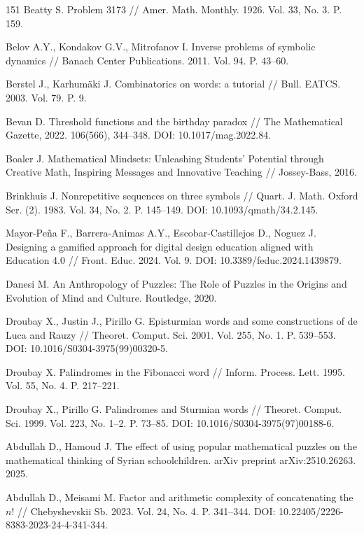 \documentclass[a4paper,14pt]{extreport}
\theoremstyle{plain}
\theoremstyle{definition}
\theoremstyle{remark}
\begin{document}
\begin{thebibliography}{151}
		Beatty S. Problem 3173 // Amer. Math. Monthly. 1926. Vol. 33, No. 3. P. 159.
		
		Belov A.Y., Kondakov G.V., Mitrofanov I. Inverse problems of symbolic dynamics // Banach Center Publications. 2011. Vol. 94. P. 43--60.
		
		Berstel J., Karhumäki J. Combinatorics on words: a tutorial // Bull. EATCS. 2003. Vol. 79. P. 9.
		
		Bevan D. Threshold functions and the birthday paradox // The Mathematical Gazette, 2022. 106(566), 344–348. DOI: 10.1017/mag.2022.84.
		
		Boaler J. Mathematical Mindsets: Unleashing Students' Potential through Creative Math, Inspiring Messages and Innovative Teaching // Jossey-Bass, 2016.
		
		Brinkhuis J. Nonrepetitive sequences on three symbols // Quart. J. Math. Oxford Ser. (2). 1983. Vol. 34, No. 2. P. 145--149. DOI: 10.1093/qmath/34.2.145.
		
		Mayor-Peña F., Barrera-Animas A.Y., Escobar-Castillejos D., Noguez J. Designing a gamified approach for digital design education aligned with Education 4.0 // Front. Educ. 2024. Vol. 9. DOI: 10.3389/feduc.2024.1439879.
		
		Danesi M. An Anthropology of Puzzles: The Role of Puzzles in the Origins and Evolution of Mind and Culture. Routledge, 2020.
		
		Droubay X., Justin J., Pirillo G. Episturmian words and some constructions of de Luca and {R}auzy // Theoret. Comput. Sci. 2001. Vol. 255, No. 1. P. 539--553. DOI: 10.1016/S0304-3975(99)00320-5.
		
		Droubay X. Palindromes in the Fibonacci word // Inform. Process. Lett. 1995. Vol. 55, No. 4. P. 217--221.
		
		Droubay X., Pirillo G. Palindromes and Sturmian words // Theoret. Comput. Sci. 1999. Vol. 223, No. 1--2. P. 73--85. DOI: 10.1016/S0304-3975(97)00188-6.
		
		Abdullah D., Hamoud J. The effect of using popular mathematical puzzles on the mathematical thinking of Syrian schoolchildren. arXiv preprint arXiv:2510.26263. 2025.
		
		Abdullah D., Meisami M. Factor and arithmetic complexity of concatenating the $n!$ // Chebyshevskii Sb. 2023. Vol. 24, No. 4. P. 341--344. DOI: 10.22405/2226-8383-2023-24-4-341-344.
		

\end{thebibliography}
\end{document}
